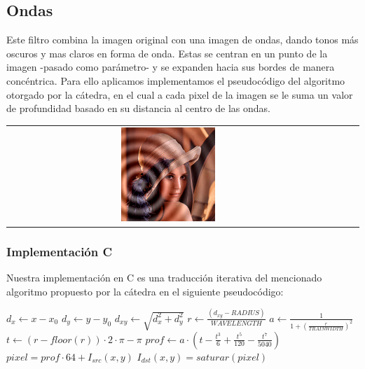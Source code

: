 \subsection{Ondas}

\begin{multicols}{2}
  Este filtro combina la imagen original con una imagen de ondas, dando tonos más oscuros y mas claros en forma de onda. Estas se centran en un punto de la imagen -pasado como parámetro- y se expanden hacia sus bordes de manera concéntrica. Para ello aplicamos implementamos el pseudocódigo del algoritmo otorgado por la cátedra, en el cual a cada pixel de la imagen se le suma un valor de profundidad basado en su distancia al centro de las ondas.
  \begin{center}
    \begin{tabular}{cccc}
      \includegraphics[width=0.3\textwidth]{imagenes/lenaONDA.jpg} \\
    \end{tabular}
     \end{center}
  \end{multicols}

\subsubsection{Implementación C}

Nuestra implementación en C es una traducción iterativa del mencionado algoritmo propuesto por la cátedra en el siguiente pseudocódigo:

\begin{algorithm}[H]
  \begin{algorithmic}[1]
      \STATE $d_x \gets x - x_0$
      \STATE
      \STATE $d_y \gets y - y_0$
      \STATE
      \STATE $d_{xy} \gets \sqrt{d_{x}^2+d_{y}^2}$
      \STATE
      \STATE $r \gets \frac{(d_{xy} - RADIUS)}{WAVELENGTH}$
      \STATE
      \STATE $a \gets \frac{1}{1 + (\frac{r}{TRAINWIDTH})^2 }$
      \STATE
      \STATE $t \gets ( r-floor(r) ) \cdot 2 \cdot \pi - \pi$
      \STATE
      \STATE $prof \gets a \cdot (t - \frac{t^3}{6}+\frac{t^5}{120}-\frac{t^7}{5040})$
      \STATE
      \STATE $pixel = prof \cdot 64 + I_{src}(x, y)$    
      \STATE
      \STATE $I_{dst}(x, y) = saturar(pixel)$
    \ENDFOR
  \end{algorithmic}
  \caption{$ondas (I_{src}, I_{dst}, x_0, y_0)$}
  \label{alg:ondas}
\end{algorithm}

